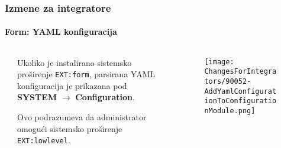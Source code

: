 \begin{frame}[fragile]
	\frametitle{Izmene za integratore}
	\framesubtitle{Form: YAML konfiguracija}

	\begin{columns}[T]
		\begin{column}{.04\textwidth}
		\end{column}
		\begin{column}{.38\textwidth}

			Ukoliko je instalirano sistemsko proširenje \texttt{EXT:form},
			 parsirana YAML konfiguracija je prikazana pod \textbf{SYSTEM} $\rightarrow$ \textbf{Configuration}.

			\vspace{0.2cm}

			Ovo podrazumeva da administrator omogući sistemsko proširenje \texttt{EXT:lowlevel}.

		\end{column}
		\begin{column}{.58\textwidth}
			\vspace{-0.3cm}
			\begin{figure}
				\texttt{[image: ChangesForIntegrators/90052-AddYamlConfigurationToConfigurationModule.png]}
			\end{figure}
		\end{column}
	\end{columns}

\end{frame}


